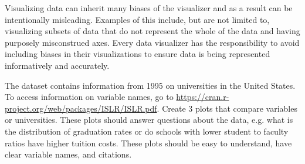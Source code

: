 \begin{warn}
Visualizing data can inherit many biases of the visualizer and as a result can be intentionally misleading.
Examples of this include, but are not limited to, visualizing subsets of data that do not represent the whole of the data and having purposely misconstrued axes.
Every data visualizer has the responsibility to avoid including biases in their visualizations to ensure data is being represented informatively and accurately.
\end{warn}
\begin{problem}
The dataset  contains information from 1995 on universities in the United States.
To access information on variable names, go to \url{https://cran.r-project.org/web/packages/ISLR/ISLR.pdf}.
Create 3 plots that compare variables or universities.
These plots should answer questions about the data, e.g. what is the distribution of graduation rates or do schools with lower student to faculty ratios have higher tuition costs.
These plots should be easy to understand, have clear variable names, and citations.
\end{problem}

